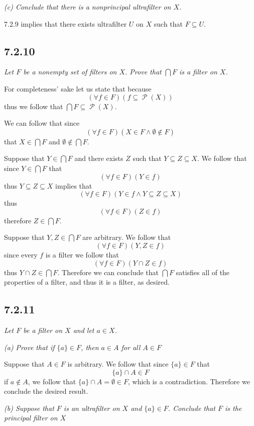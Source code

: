 \documentclass[11pt,oneside,titlepage]{book}
\DeclareMathOperator \pow {\mathcal {P}}
\newcommand{\set}[1]{\{ #1 \}}
\begin{document}
\textit{(c) Conclude that there is a nonprincipal ultrafilter on $X$.}

7.2.9 implies that there exists ultrafilter $U$ on $X$ such that $F \subseteq U$.

\subsection*{7.2.10}

\textit{Let $F$ be a nonempty set of filters on $X$. Prove that $\bigcap{F}$ is a filter on $X$.}

For completeness' sake let us state that because
$$(\forall f \in F)(f \subseteq \pow(X))$$
thus we follow that $\bigcap{F} \subseteq \pow(X)$.

We can follow that since
$$(\forall f \in F)(X \in F \land \emptyset \notin F)$$
that $X \in \bigcap{F}$ and $\emptyset \notin \bigcap{F}$.

Suppose that $Y \in \bigcap{F}$ and there exists $Z$  such that $Y \subseteq Z \subseteq X$.
We follow that since $Y \in \bigcap{F}$ that
$$(\forall f \in F)(Y \in f)$$
thus $Y \subseteq Z \subseteq X$ implies that
$$(\forall f \in F)(Y \in f \land Y \subseteq Z \subseteq X)$$
thus
$$(\forall f \in F)(Z \in f)$$
therefore $Z \in \bigcap{F}$.

Suppose that $Y, Z \in \bigcap{F}$ are arbitrary. We follow that
$$(\forall f \in F)(Y, Z \in f)$$
since every $f$ is a filter we follow that
$$(\forall f \in F)(Y \cap Z \in f)$$
thus $Y \cap Z \in \bigcap{F}$. Therefore we can conclude that $\bigcap{F}$ satisfies
all of the properties of a filter, and thus it is a filter, as desired.

\subsection*{7.2.11}

\textit{Let $F$ be a filter on $X$ and let $a \in X$.}

\textit{(a) Prove that if $\set{a} \in F$, then $a \in A$ for all $A \in F$}

Suppose that $A \in F$ is arbitrary. We follow that since $\set{a} \in F$ that
$$\set{a} \cap A \in F$$
if $a \notin A$, we follow that $\set{a} \cap A = \emptyset \in F$, which is a contradiction.
Therefore we conclude the desired result.

\textit{(b) Suppose that $F$ is an ultrafilter on $X$ and $\set{a} \in F$. Conclude that
  $F$ is the principal filter on $X$}
\end{document}
